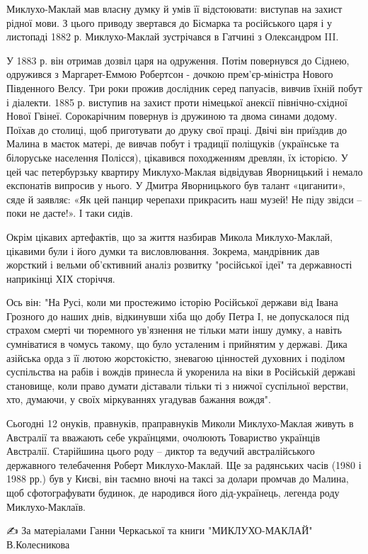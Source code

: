 Миклухо-Маклай мав власну думку й умів її відстоювати: виступав на захист
рідної мови. З цього приводу звертався до Бісмарка та російського царя і у
листопаді 1882 р. Миклухо-Маклай зустрічався в Гатчині з Олександром III.

У 1883 р. він отримав дозвіл царя на одруження. Потім повернувся до Сіднею,
одружився з Маргарет-Еммою Робертсон - дочкою прем'єр-міністра Нового
Південного Велсу. Три роки прожив дослідник серед папуасів, вивчив їхній побут
і діалекти. 1885 р. виступив на захист проти німецької анексії північно-східної
Нової Гвінеї. Сорокарічним повернув із дружиною та двома синами додому. Поїхав
до столиці, щоб приготувати до друку свої праці. Двічі він приїздив до Малина в
маєток матері, де вивчав побут і традиції поліщуків (українське та білоруське
населення Полісся), цікавився походженням древлян, їх історією. У цей час
петербурзьку квартиру Миклухо-Маклая відвідував Яворницький і немало експонатів
випросив у нього. У Дмитра Яворницького був талант «циганити», сяде й заявляє:
«Як цей панцир черепахи прикрасить наш музей! Не піду звідси – поки не дасте!».
І таки сидів.

Окрім цікавих артефактів, що за життя назбирав Микола Миклухо-Маклай, цікавими
були і його думки та висловлювання. Зокрема, мандрівник дав жорсткий і вельми
об'єктивний аналіз розвитку "російської ідеї" та державності наприкінці ХІХ
сторіччя.

Ось він: "На Русі, коли ми простежимо історію Російської держави від Івана
Грозного до наших днів, відкинувши хіба що добу Петра I, не допускалося під
страхом смерті чи тюремного ув'язнення не тільки мати іншу думку, а навіть
сумніватися в чомусь такому, що було усталеним і прийнятим у державі. Дика
азійська орда з її лютою жорстокістю, зневагою цінностей духовних і поділом
суспільства на рабів і вождів принесла й укоренила на віки в Російській державі
становище, коли право думати діставали тільки ті з нижчої суспільної верстви,
хто, думаючи, у своїх міркуваннях угадував бажання вождя".

Сьогодні 12 онуків, правнуків, праправнуків Миколи Миклухо-Маклая живуть в
Австралії та вважають себе українцями, очолюють Товариство українців Австралії.
Старійшина цього роду – диктор та ведучий австралійського державного
телебачення Роберт Миклухо-Маклай. Ще за радянських часів (1980 і 1988 рр.) був
у Києві, він таємно вночі на таксі за долари промчав до Малина, щоб
сфотографувати будинок, де народився його дід-українець, легенда роду
Миклухо-Маклаїв.

✍️ За матеріалами Ганни Черкаської та книги "МИКЛУХО-МАКЛАЙ" В.Колесникова
